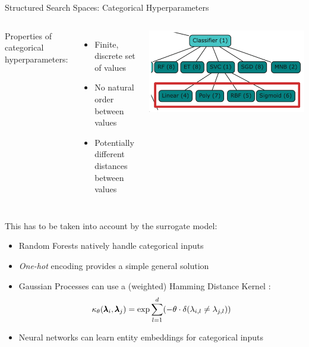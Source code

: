 \begin{frame}[c]{Structured Search Spaces: Categorical Hyperparameters}

\begin{columns}[T]

\medskip
Properties of categorical hyperparameters:
\begin{itemize}
    \item \alert{Finite, discrete} set of values
    \item \alert{No natural order} between values 
    \item Potentially different distances between values
\end{itemize}


\vspace{0.5cm}
\includegraphics[width=1\textwidth]{images/categ_cond_params/categorical.png}
%
\end{columns}

\pause
\vspace*{-0.4cm}
This has to be taken into account by the surrogate model:
%
\begin{itemize}
    \item Random Forests \alert{natively} handle categorical inputs 
    \item \emph{One-hot} encoding provides a simple general solution
    \item Gaussian Processes can use a (weighted) \alert{Hamming Distance Kernel} :
\vspace*{-0.2cm}
\begin{equation*}
    \kappa_{\theta}(\pmb{\lambda}_i, \pmb{\lambda}_j) = \exp{\sum_{l=1}^d (-\theta \cdot \delta(\lambda_{i,l} \neq \lambda_{j,l}))}
\end{equation*}

\vspace*{-0.2cm}
\item Neural networks can learn \alert{entity embeddings} for categorical inputs 
\end{itemize}
%
\end{frame}
